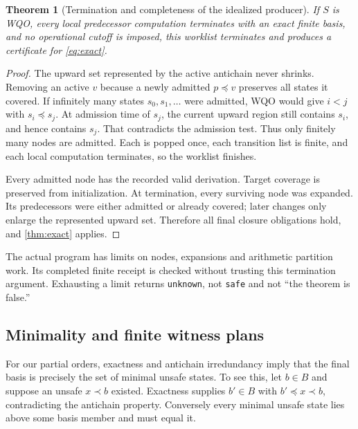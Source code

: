 \documentclass[11pt,a4paper]{article}
\newtheorem{theorem}{Theorem}[section]
\theoremstyle{definition}
\newcommand{\code}[1]{\texttt{#1}}
\begin{document}
\begin{theorem}[Termination and completeness of the idealized producer]
\label{thm:termination}
If $S$ is WQO, every local predecessor computation terminates with an exact
finite basis, and no operational cutoff is imposed, this worklist terminates
and produces a certificate for \eqref{eq:exact}.
\end{theorem}
\begin{proof}
The upward set represented by the active antichain never shrinks. Removing
an active $v$ because a newly admitted $p\preceq v$ preserves all states it
covered. If infinitely many states $s_0,s_1,\ldots$ were admitted, WQO would
give $i<j$ with $s_i\preceq s_j$. At admission time of $s_j$, the current
upward region still contains $s_i$, and hence contains $s_j$. That contradicts
the admission test. Thus only finitely many nodes are admitted. Each is
popped once, each transition list is finite, and each local computation
terminates, so the worklist finishes.

Every admitted node has the recorded valid derivation. Target coverage is
preserved from initialization. At termination, every surviving node was
expanded. Its predecessors were either admitted or already covered; later
changes only enlarge the represented upward set. Therefore all final
closure obligations hold, and \cref{thm:exact} applies.
\end{proof}

The actual program has limits on nodes, expansions and arithmetic partition
work. Its completed finite receipt is checked without trusting this termination
argument. Exhausting a limit returns \code{unknown}, not \code{safe} and not
``the theorem is false.''

\subsection{Minimality and finite witness plans}
For our partial orders, exactness and antichain irredundancy imply that the
final basis is precisely the set of minimal unsafe states. To see this, let
$b\in B$ and suppose an unsafe $x\prec b$ existed. Exactness supplies
$b'\in B$ with $b'\preceq x\prec b$, contradicting the antichain property.
Conversely every minimal unsafe state lies above some basis member and must
equal it.
\end{document}
